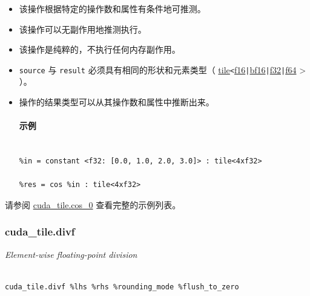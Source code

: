 \documentclass{article}
\begin{document}
\begin{itemize}
\item 该操作根据特定的操作数和属性有条件地可推测。
\item 该操作可以无副作用地推测执行。
\item 该操作是纯粹的，不执行任何内存副作用。
\item \texttt{source} 与 \texttt{result} 必须具有相同的形状和元素类型（ \href{https://docs.nvidia.com/cuda/tile-ir/latest/sections/types.html#type-tile}{tile}\texttt{<}\href{https://docs.nvidia.com/cuda/tile-ir/latest/sections/types.html#subsection-element-types}{f16}\texttt{|}\href{https://docs.nvidia.com/cuda/tile-ir/latest/sections/types.html#subsection-element-types}{bf16}\texttt{|}\href{https://docs.nvidia.com/cuda/tile-ir/latest/sections/types.html#subsection-element-types}{f32}\texttt{|}\href{https://docs.nvidia.com/cuda/tile-ir/latest/sections/types.html#subsection-element-types}{f64} > ）。
\item 操作的结果类型可以从其操作数和属性中推断出来。




\paragraph{示例}


\begin{lstlisting}

%in = constant <f32: [0.0, 1.0, 2.0, 3.0]> : tile<4xf32>

%res = cos %in : tile<4xf32>

\end{lstlisting}



\end{itemize}
请参阅 \href{https://docs.nvidia.com/cuda/tile-ir/latest/sections/appendix.html#example-cuda-tile-cos-0}{cuda\_tile.cos\_0} 查看完整的示例列表。





\subsubsection{cuda\_tile.divf}


\textit{Element-wise floating-point division}




\begin{lstlisting}

cuda_tile.divf %lhs %rhs %rounding_mode %flush_to_zero

\end{lstlisting}
\end{document}
